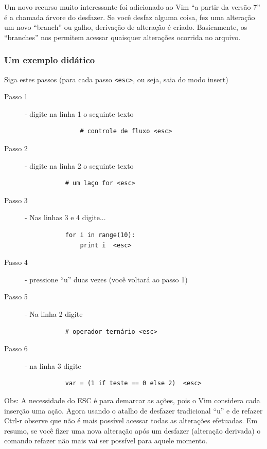 \documentclass[10pt,a4paper,openany]{book}
\begin{document}
Um novo recurso muito interessante foi adicionado ao Vim ``a partir da
versão 7''  é a chamada árvore do desfazer.  Se
você desfaz alguma coisa, fez uma alteração um novo ``branch'' ou
galho, derivação de alteração é criado.  Basicamente, os ``branches''
nos permitem acessar quaisquer alterações ocorrida no arquivo.

\subsubsection{Um exemplo didático}
\label{Um exemplo didático}

Siga estes passos (para cada passo \verb|<esc>|, ou seja, saia do modo
insert)


\begin{description}
\item [Passo 1] - digite na linha 1 o seguinte texto
\begin{verbatim}
			   # controle de fluxo <esc>
\end{verbatim}

\item [Passo 2] - digite na linha 2 o seguinte texto
\begin{verbatim}
		   # um laço for <esc>
\end{verbatim}

\item [Passo 3] - Nas linhas 3 e 4 digite...

\begin{verbatim}
		   for i in range(10):
			   print i  <esc>
\end{verbatim}

\item [Passo 4] - pressione ``u'' duas vezes (você voltará ao passo 1)
\item [Passo 5] - Na linha 2 digite

\begin{verbatim}
		   # operador ternário <esc>
\end{verbatim}

\item [Passo 6] - na linha 3 digite

\begin{verbatim}
		   var = (1 if teste == 0 else 2)  <esc>
\end{verbatim}

\end{description}

Obs: A necessidade do ESC é para demarcar as ações, pois o Vim
considera cada inserção uma ação.  Agora usando o atalho de desfazer
tradicional ``u'' e de refazer Ctrl-r observe que não é mais possível
acessar todas as alterações efetuadas. Em resumo, se você fizer uma
nova alteração após um desfazer (alteração derivada) o comando refazer
não mais vai ser possível para aquele momento. \\
\end{document}
